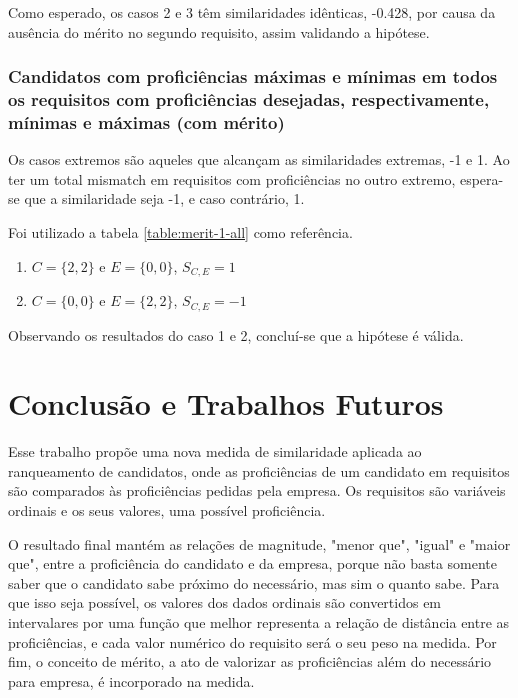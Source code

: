 \documentclass[preprint,12pt]{elsarticle}
\begin{document}
Como esperado, os casos 2 e 3 têm similaridades idênticas, -0.428, por causa da ausência do mérito no segundo requisito, assim validando a hipótese.

\subsubsection{Candidatos com proficiências máximas e mínimas em todos os requisitos com proficiências desejadas, respectivamente, mínimas e máximas (com mérito)}

Os casos extremos são aqueles que alcançam as similaridades extremas, -1 e 1. Ao ter um total mismatch em requisitos com proficiências no outro extremo, espera-se que a similaridade seja -1, e caso contrário, 1.

Foi utilizado a tabela \ref{table:merit-1-all} como referência.

\begin{enumerate}
    \item $C = \{2,2\}$ e $E = \{0,0\}$, $S_{C,E} = 1$
    \item $C = \{0,0\}$ e $E = \{2,2\}$, $S_{C,E} = -1$
\end{enumerate}

Observando os resultados do caso 1 e 2, concluí-se que a hipótese é válida.

\section{Conclusão e Trabalhos Futuros}
\label{sec:sample5}

Esse trabalho propõe uma nova medida de similaridade aplicada ao ranqueamento de candidatos, onde as proficiências de um candidato em requisitos são comparados às proficiências pedidas pela empresa. Os requisitos são variáveis ordinais e os seus valores, uma possível proficiência. 

O resultado final mantém as relações de magnitude, "menor que", "igual" e "maior que", entre a proficiência do candidato e da empresa, porque não basta somente saber que o candidato sabe próximo do necessário, mas sim o quanto sabe. Para que isso seja possível, os valores dos dados ordinais são convertidos em intervalares por uma função que melhor representa a relação de distância entre as proficiências, e cada valor numérico do requisito será o seu peso na medida. Por fim, o conceito de mérito, a ato de valorizar as proficiências além do necessário para empresa, é incorporado na medida.
\end{document}
